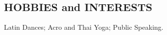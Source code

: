 \documentclass[11pt]{res}
\begin{document}
\begin{resume}
\vspace{-0.1in}
\section{HOBBIES and INTERESTS}
\vspace{0.1in}
Latin Dances; Acro and Thai Yoga; Public Speaking.


\end{resume}
\end{document}
